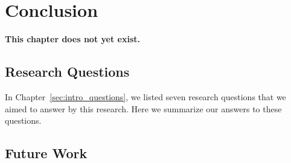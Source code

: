 \chapter{Conclusion}
\label{chap:conclusion}

\textbf{\color{red} This chapter does not yet exist.}

\section{Research Questions}

In Chapter~\ref{sec:intro_questions}, we listed seven research questions that we aimed to answer by this research.
Here we summarize our answers to these questions.

\section{Future Work}
